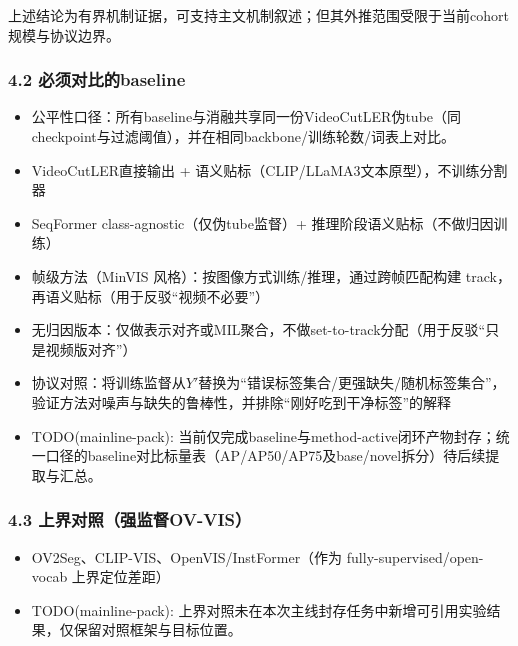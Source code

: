 \documentclass[UTF8]{ctexart}
\begin{document}
上述结论为有界机制证据，可支持主文机制叙述；但其外推范围受限于当前cohort规模与协议边界。

\subsubsection*{4.2 必须对比的baseline}
\begin{itemize}
\item 公平性口径：所有baseline与消融共享同一份VideoCutLER伪tube（同checkpoint与过滤阈值），并在相同backbone/训练轮数/词表上对比。
\item VideoCutLER直接输出 + 语义贴标（CLIP/LLaMA3文本原型），不训练分割器
\item SeqFormer class-agnostic（仅伪tube监督）+ 推理阶段语义贴标（不做归因训练）
\item 帧级方法（MinVIS 风格）：按图像方式训练/推理，通过跨帧匹配构建 track，再语义贴标（用于反驳“视频不必要”）
\item 无归因版本：仅做表示对齐或MIL聚合，不做set-to-track分配（用于反驳“只是视频版对齐”）
\item 协议对照：将训练监督从$Y'$替换为“错误标签集合/更强缺失/随机标签集合”，验证方法对噪声与缺失的鲁棒性，并排除“刚好吃到干净标签”的解释
\item TODO(mainline-pack): 当前仅完成baseline与method-active闭环产物封存；统一口径的baseline对比标量表（AP/AP50/AP75及base/novel拆分）待后续提取与汇总。
\end{itemize}

\subsubsection*{4.3 上界对照（强监督OV-VIS）}
\begin{itemize}
\item OV2Seg、CLIP-VIS、OpenVIS/InstFormer（作为 fully-supervised/open-vocab 上界定位差距）
\item TODO(mainline-pack): 上界对照未在本次主线封存任务中新增可引用实验结果，仅保留对照框架与目标位置。
\end{itemize}
\end{document}
